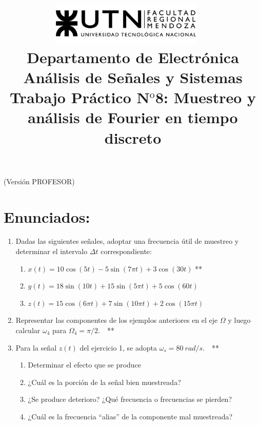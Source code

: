 \documentclass[10pt,a4paper]{article}
\title{
	\textsc{\includegraphics[width=0.55\textwidth]{logoUTN.jpg}} ~\\
	{\large Departamento de Electr\'onica}\\ 
	[0.1cm]
	{\Huge{An\'alisis de Se\~nales y Sistemas}} \\
	[0.25cm]
	{\Large{Trabajo Pr\'{a}ctico N$^{\text {o}}$8: Muestreo y análisis de Fourier en tiempo discreto}		
	\\
	}}
\author{}
\date{}
\begin{document}
\maketitle
\begin{profesor}
	\hspace{6cm}(Versión PROFESOR)
\end{profesor}
\thispagestyle{fancy}

\section*{Enunciados:}
\label{sec:enun}

\begin{enumerate}
\subsubsection*{Muestreo}
\item {Dadas las siguientes señales, adoptar una frecuencia útil de muestreo y determinar el intervalo $\Delta t$ 
correspondiente:}
\begin{enumerate}
\item $x(t)=10\cos(5t)-5\sin(7\pi t)+3\cos(30t)$ **				
\item $y(t)=18\sin(10t)+15\sin(5\pi t)+5\cos(60t)$
\item $z(t)=15\cos(6\pi t)+7\sin(10\pi t)+2\cos(15\pi t)$			
\end{enumerate}	

\item {Representar las componentes de los ejemplos anteriores en el eje $\Omega$ y luego calcular $\omega_4$ para 
$\Omega_4=\pi/2$.~~**}

\item {Para la señal $z(t)$ del ejercicio 1, se adopta $\omega_s=80~rad/s$}.~~**
\begin{enumerate}
	\item Determinar el efecto que se produce				
	\item ¿Cuál es la porción de la señal bien muestreada?
	\item ¿Se produce deterioro? ¿Qué frecuencia o frecuencias se pierden?
	\item ¿Cuál es la frecuencia ``alias'' de la componente mal muestreada?			
\end{enumerate}	


\end{enumerate}
\end{document}
